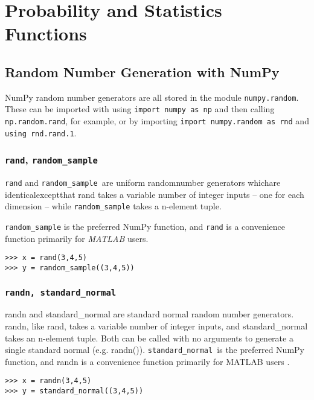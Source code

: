 \documentclass[KSmain.tex]{subfiles}
\begin{document}
 
	\large
\section{Probability and Statistics Functions}
\subsection{Random Number Generation with NumPy}
NumPy random number generators are all stored in the module \texttt{numpy.random}. 
These can be imported with using \texttt{import numpy as np} and then calling \texttt{np.random.rand}, for example, or 
by importing \texttt{import numpy.random as rnd} and \texttt{using rnd.rand.1}.
\subsubsection{\texttt{rand}, \texttt{random\_sample}}
\texttt{rand} and \texttt{random\_sample }are uniform randomnumber generators whichare
 identicalexceptthat rand takes a variable number 
of integer inputs – one for each dimension – while \texttt{random\_sample} takes a n-element tuple. 

\texttt{random\_sample} is the preferred NumPy function, and \texttt{rand} is a convenience function primarily for \textit{MATLAB} users.
\begin{framed}
\begin{verbatim}
>>> x = rand(3,4,5) 
>>> y = random_sample((3,4,5))
\end{verbatim}
\end{framed}


\subsubsection{\texttt{randn, standard\_normal}}
randn and standard\_normal are standard normal random number generators. randn, like rand, takes a
variable number of integer inputs, and standard\_normal takes an n-element tuple. Both can be called
with no arguments to generate a single standard normal (e.g. randn()). \texttt{standard\_normal }is the preferred
NumPy function, and randn is a convenience function primarily for MATLAB users .
\begin{framed}
\begin{verbatim}
>>> x = randn(3,4,5)
>>> y = standard_normal((3,4,5))
\end{verbatim}
\end{framed}
\end{document}
